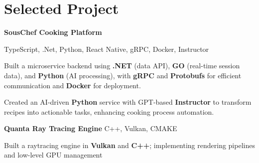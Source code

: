 
\newenvironment{twocolentry_proj}[2][]{
    \onecolentry
    \def\secondColumn{#2}
    \setcolumnwidth{\fill, 9 cm}
    \begin{paracol}{2}
}{
    \switchcolumn \raggedleft \secondColumn
    \end{paracol}
    \endonecolentry
} %

\vspace{5 pt - 0.4 cm}
\section{Selected Project}
\begin{twocolentry_proj}{
    \mbox{}%
}

\textbf{SousChef Cooking Platform}
\end{twocolentry_proj}

\vspace{0.10 cm}
\begin{onecolentry}
    \small TypeScript, .Net, Python, React Native, gRPC, Docker, Instructor 
    \begin{highlights}
        \item Built a microservice backend using  \textbf{.NET} (data API),  \textbf{GO} (real-time session data), and  \textbf{Python} (AI processing), with \textbf{gRPC} and \textbf{Protobufs} for efficient communication and \textbf{Docker} for deployment.
        \item Created an AI-driven  \textbf{Python} service with GPT-based \textbf{Instructor} to transform recipes into actionable tasks, enhancing cooking process automation.
    \end{highlights}
\end{onecolentry}


\vspace{0.10 cm}
\begin{twocolentry_proj}{
    \mbox{}%
}
\fontsize{11 pt}{11 pt}\textbf{Quanta Ray Tracing Engine} C++, Vulkan, CMAKE
\end{twocolentry_proj}
\begin{onecolentry}
    \begin{highlights}
        \item Built a raytracing engine in \textbf{Vulkan} and \textbf{C++}; implementing rendering pipelines and low-level GPU management
    \end{highlights}
\end{onecolentry}